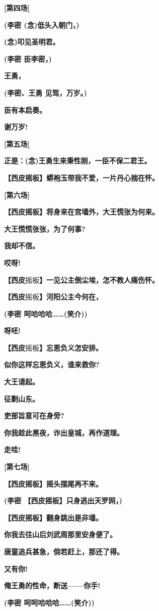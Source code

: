 \textbf{{[}第四场{]}}

\textbf{(李密 (念)低头入朝门，)}

\textbf{(念)叩见圣明君。}

\textbf{(李密 臣李密，)}

\textbf{王勇，}

\textbf{(李密、王勇 见驾，万岁。)}

\textbf{臣有本启奏。}

\textbf{谢万岁!}

\textbf{{[}第五场{]}}

\textbf{正是：(念)王勇生来秉性刚，一臣不保二君王。}

\textbf{【西皮摇板】蟒袍玉带我不爱，一片丹心揣在怀。}

\textbf{{[}第六场{]}}

\textbf{【西皮摇板】将身来在宫墙外，大王慌张为何来。}

\textbf{大王慌慌张张，为了何事?}

\textbf{我却不信。}

\textbf{哎呀!}

\textbf{【西皮}摇板\textbf{】一见公主倒尘埃，怎不教人痛伤怀。}

\textbf{【西皮}摇板\textbf{】河阳公主今何在，}

\textbf{(李密 呵哈哈哈\ldots{}\ldots{}(笑介))}

\textbf{呀呸!}

\textbf{【西皮}摇板\textbf{】忘恩负义怎安排。}

\textbf{似你这样忘恩负义，谁来救你?}

\textbf{大王请起。}

\textbf{征剿山东。}

\textbf{吏部旨意可在身旁?}

\textbf{你我趁此黑夜，诈出皇城，再作道理。}

\textbf{走哇!}

\textbf{{[}第七场{]}}

\textbf{【西皮摇板】摇头摆尾再不来。}

\textbf{(李密 【西皮摇板】只身逃出天罗网，)}

\textbf{【西皮摇板】翻身跳出是非墙。}

\textbf{你我去往山后刘武周那里安身便了。}

\textbf{唐童追兵甚急，倘若赶上，那还了得。}

\textbf{又有你!}

\textbf{俺王勇的性命，断送------你手!}

\textbf{(李密 呵呵哈哈哈\ldots{}\ldots{}(笑介))}

